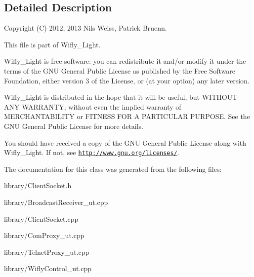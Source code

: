 \subsection{Detailed Description}
\begin{DoxyVerb}Copyright (C) 2012, 2013 Nils Weiss, Patrick Bruenn.
\end{DoxyVerb}


This file is part of Wifly\-\_\-\-Light.

Wifly\-\_\-\-Light is free software\-: you can redistribute it and/or modify it under the terms of the G\-N\-U General Public License as published by the Free Software Foundation, either version 3 of the License, or (at your option) any later version.

Wifly\-\_\-\-Light is distributed in the hope that it will be useful, but W\-I\-T\-H\-O\-U\-T A\-N\-Y W\-A\-R\-R\-A\-N\-T\-Y; without even the implied warranty of M\-E\-R\-C\-H\-A\-N\-T\-A\-B\-I\-L\-I\-T\-Y or F\-I\-T\-N\-E\-S\-S F\-O\-R A P\-A\-R\-T\-I\-C\-U\-L\-A\-R P\-U\-R\-P\-O\-S\-E. See the G\-N\-U General Public License for more details.

You should have received a copy of the G\-N\-U General Public License along with Wifly\-\_\-\-Light. If not, see \href{http://www.gnu.org/licenses/}{\tt http\-://www.\-gnu.\-org/licenses/}. 

The documentation for this class was generated from the following files\-:\begin{DoxyCompactItemize}
\item 
library/Client\-Socket.\-h\item 
library/Broadcast\-Receiver\-\_\-ut.\-cpp\item 
library/Client\-Socket.\-cpp\item 
library/Com\-Proxy\-\_\-ut.\-cpp\item 
library/Telnet\-Proxy\-\_\-ut.\-cpp\item 
library/Wifly\-Control\-\_\-ut.\-cpp\end{DoxyCompactItemize}
